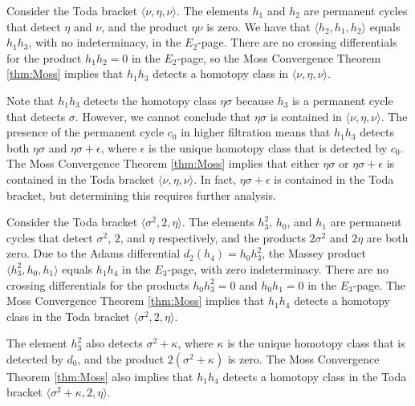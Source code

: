 \begin{ex}
Consider the Toda bracket $\langle \nu, \eta, \nu \rangle$.
The elements $h_1$ and $h_2$ are permanent cycles that detect 
$\eta$ and $\nu$, and the product $\eta \nu$ is zero.
We have that $\langle h_2, h_1, h_2 \rangle$ equals $h_1 h_3$,
with no indeterminacy, in the $E_2$-page.
There are no crossing differentials for the product $h_1 h_2 = 0$ 
in the $E_2$-page, so the Moss Convergence Theorem \ref{thm:Moss}
implies that  $h_1 h_3$ detects a homotopy class
in $\langle \nu, \eta, \nu \rangle$.

Note that $h_1h_3$ detects the homotopy class $\eta\sigma$ because
$h_3$ is a permanent cycle that detects $\sigma$. 
However, we cannot conclude that
$\eta\sigma$ is contained in $\langle \nu, \eta, \nu \rangle$. 
The presence of the permanent cycle $c_0$
in higher filtration means that $h_1 h_3$ detects both
$\eta \sigma$ and $\eta \sigma +\epsilon$, where $\epsilon$
is the unique homotopy class that is detected by $c_0$.
The Moss Convergence Theorem \ref{thm:Moss} implies that
either $\eta \sigma$ or $\eta \sigma + \epsilon$ is contained in
the Toda bracket $\langle \nu, \eta, \nu \rangle$.
In fact, $\eta \sigma + \epsilon$ is contained in the Toda bracket,
but determining this requires further analysis.
\end{ex}

\begin{ex}
Consider the Toda bracket $\langle \sigma^2, 2, \eta \rangle$.
The elements $h_3^2$, $h_0$, and $h_1$ are permanent cycles
that detect $\sigma^2$, $2$, and $\eta$ respectively, and
the products $2 \sigma^2$ and $2 \eta$ are both zero.
Due to the Adams differential $d_2(h_4) = h_0h_3^2$, the Massey product 
$\langle h_3^2, h_0, h_1 \rangle$ equals $h_1 h_4$ in the
$E_3$-page, with zero indeterminacy. 
There are no crossing differentials for the products $h_0 h_3^2 = 0$ 
and $h_0 h_1 = 0$ in the $E_3$-page.
The Moss Convergence Theorem \ref{thm:Moss} implies that
$h_1 h_4$ detects a homotopy class in the Toda bracket 
$\langle \sigma^2, 2, \eta \rangle$.

The element $h_3^2$ also detects $\sigma^2 + \kappa$, 
where $\kappa$ is the unique homotopy class that is detected by $d_0$,
and the product $2 (\sigma^2 + \kappa)$ is zero.
The Moss Convergence Theorem \ref{thm:Moss} also implies that
$h_1 h_4$ detects a homotopy class in the Toda bracket 
$\langle \sigma^2 + \kappa, 2, \eta \rangle$. 
\end{ex}

